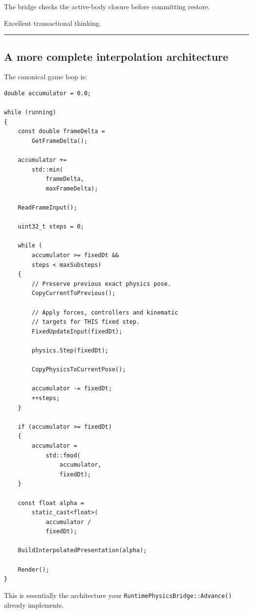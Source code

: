 The bridge checks the active-body closure before committing restore.

Excellent transactional thinking.

\begin{center}\rule{0.5\linewidth}{0.5pt}\end{center}

\subsection{A more complete interpolation architecture}\label{06-engine-ii-ch038-a-more-complete-interpolation-architecture}

\hypertarget{06-engine-ii-ch038-a-more-complete-interpolation-architecture}{}

The canonical game loop is:

\begin{verbatim}
double accumulator = 0.0;

while (running)
{
    const double frameDelta =
        GetFrameDelta();

    accumulator +=
        std::min(
            frameDelta,
            maxFrameDelta);

    ReadFrameInput();

    uint32_t steps = 0;

    while (
        accumulator >= fixedDt &&
        steps < maxSubsteps)
    {
        // Preserve previous exact physics pose.
        CopyCurrentToPrevious();

        // Apply forces, controllers and kinematic
        // targets for THIS fixed step.
        FixedUpdateInput(fixedDt);

        physics.Step(fixedDt);

        CopyPhysicsToCurrentPose();

        accumulator -= fixedDt;
        ++steps;
    }

    if (accumulator >= fixedDt)
    {
        accumulator =
            std::fmod(
                accumulator,
                fixedDt);
    }

    const float alpha =
        static_cast<float>(
            accumulator /
            fixedDt);

    BuildInterpolatedPresentation(alpha);

    Render();
}
\end{verbatim}

This is essentially the architecture your \texttt{RuntimePhysicsBridge::Advance()} already implements.

